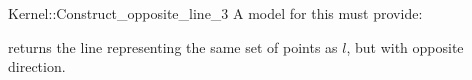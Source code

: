 \begin{ccRefFunctionObjectConcept}{Kernel::Construct_opposite_line_3}
A model for this must provide:


{returns the line representing the same set of points as $l$,
but with opposite direction.}

\ccIsModel{}

\end{ccRefFunctionObjectConcept}
